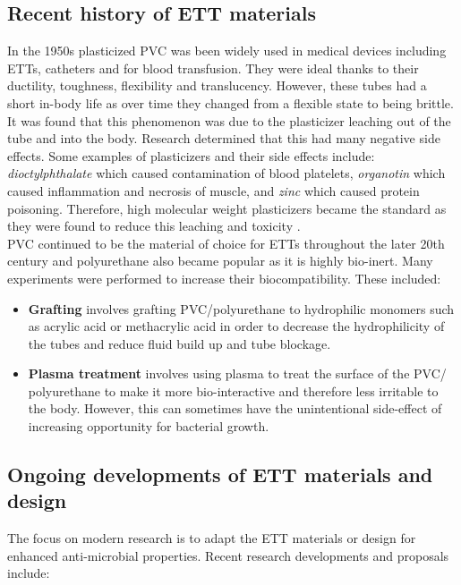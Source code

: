 \documentclass[12pt, openany, oneside]{book}
\begin{document}
\subsection{Recent history of ETT materials}
In the 1950s plasticized PVC was been widely used in medical devices including ETTs, catheters and for blood transfusion. They were ideal thanks to their ductility, toughness, flexibility and translucency. However, these tubes had a short in-body life as over time they changed from a flexible state to being brittle. It was found that this phenomenon was due to the plasticizer leaching out of the tube and into the body. Research determined that this had many negative side effects. Some examples of plasticizers and their side effects include: \textit{dioctylphthalate} which caused contamination of blood platelets, \textit{organotin} which caused inflammation and necrosis of muscle, and \textit{zinc} which caused protein poisoning. Therefore, high molecular weight plasticizers became the standard as they were found to reduce this leaching and toxicity \citep{singh1992}. \\

PVC continued to be the material of choice for ETTs throughout the later 20th century and polyurethane also became popular as it is highly bio-inert. Many experiments were performed to increase their biocompatibility. These included:

\begin{itemize}
\item{{\bf{Grafting}} involves grafting PVC/polyurethane to hydrophilic monomers such as acrylic acid or methacrylic acid in order to decrease the hydrophilicity of the tubes and reduce fluid build up and tube blockage.}
\item{{\bf{Plasma treatment}} involves using plasma to treat the surface of the PVC/ polyurethane to make it more bio-interactive and therefore less irritable to the body. However, this can sometimes have the unintentional side-effect of increasing opportunity for bacterial growth.\citep{singh1992}}
\end{itemize}



\subsection{Ongoing developments of ETT materials and design}
The focus on modern research is to adapt the ETT materials or design for enhanced anti-microbial properties. Recent research developments and proposals include:
\end{document}
